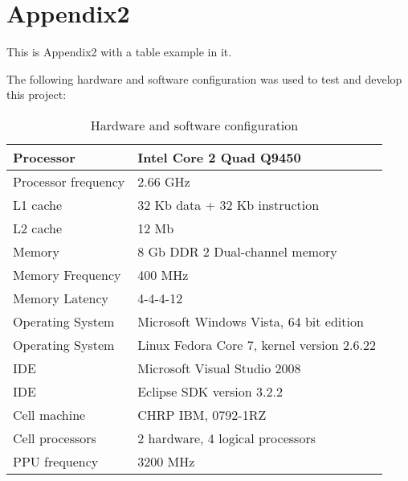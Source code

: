 \normalfont\normalsize
\chapter{Appendix2}

This is Appendix2 with a table example in it.

The following hardware and software configuration was used to test and develop this project:

\begin{table}[htb]
\centering
\begin{tabular}{|l|p{9 cm}|}
\hline
Processor						&	Intel Core 2 Quad Q9450\\
\hline
Processor frequency				&	2.66 GHz\\
\hline
L1 cache						&	32 Kb data + 32 Kb instruction\\
\hline
L2 cache						&	12 Mb\\
\hline
Memory							&	8 Gb DDR 2 Dual-channel memory\\
\hline
Memory Frequency				&	400 MHz\\
\hline
Memory Latency					&	4-4-4-12\\
\hline
Operating System				&	Microsoft Windows Vista, 64 bit edition\\
\hline
Operating System				&	Linux Fedora Core 7, kernel version 2.6.22\\
\hline
IDE								&	Microsoft Visual Studio 2008\\
\hline
IDE								&	Eclipse SDK version 3.2.2\\
\hline
Cell machine					&	CHRP IBM, 0792-1RZ\\
\hline
Cell processors					&	2 hardware, 4 logical processors\\
\hline
PPU frequency					&	3200 MHz\\
\hline
\end{tabular}
\caption{Hardware and software configuration}
\label{table:Hardware}
\end{table}
